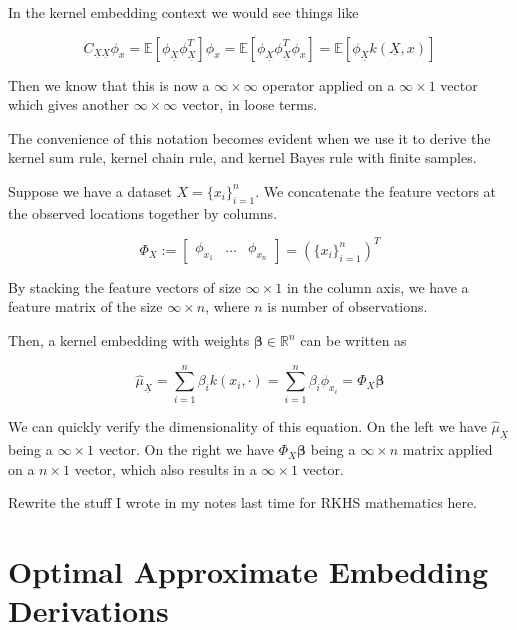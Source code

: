 \documentclass[twoside]{article} \usepackage{aistats2017}
\newcommand{\rv}[1]{\underline{#1}}
\newcommand{\warn}[1]{{\color{red} #1}}
\begin{document}
	In the kernel embedding context we would see things like
	
		\begin{equation}
			C_{\rv{X} \rv{X}} \phi_{x} = \mathbb{E}[\phi_{\rv{X}} \phi_{\rv{X}}^{T}] \phi_{x} = \mathbb{E}[\phi_{\rv{X}} \phi_{\rv{X}}^{T} \phi_{x}] = \mathbb{E}[\phi_{\rv{X}} k(\rv{X}, x)]
		\end{equation}
			
	Then we know that this is now a $\infty \times \infty$ operator applied on a $\infty \times 1$ vector which gives another $\infty \times \infty$ vector, in loose terms.
	
	The convenience of this notation becomes evident when we use it to derive the kernel sum rule, kernel chain rule, and kernel Bayes rule with finite samples.
	
	Suppose we have a dataset $X = \{x_{i}\}_{i = 1}^{n}$. We concatenate the feature vectors at the observed locations together by columns.
	
	\begin{equation}
		\Phi_{X} := \begin{bmatrix} \phi_{x_{1}} & \dots & \phi_{x_{n}} \end{bmatrix} = (\{x_{i}\}_{i = 1}^{n})^{T}
	\end{equation}
	
	By stacking the feature vectors of size $\infty \times 1$ in the column axis, we have a feature matrix of the size $\infty \times n$, where $n$ is number of observations.
	
	Then, a kernel embedding with weights $\bm{\beta} \in \mathbb{R}^{n}$ can be written as
	
	\begin{equation}
		\hat{\mu}_{\rv{X}} = \sum_{i = 1}^{n} \beta_{i} k(x_{i}, \cdot) = \sum_{i = 1}^{n} \beta_{i} \phi_{x_{i}} = \Phi_{X} \bm{\beta}
	\end{equation}
	
	We can quickly verify the dimensionality of this equation. On the left we have  $\hat{\mu}_{\rv{X}}$ being a $\infty \times 1$ vector. On the right we have $\Phi_{X} \bm{\beta}$ being a $\infty \times n$ matrix applied on a $n \times 1$ vector, which also results in a $\infty \times 1$ vector.
	
	\warn{Rewrite the stuff I wrote in my notes last time for RKHS mathematics here.}
	
\section{Optimal Approximate Embedding Derivations}
\end{document}
